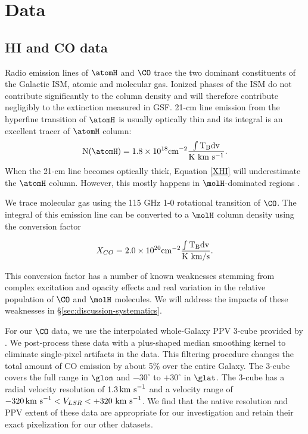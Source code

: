 \section{Data}
\label{sec:data}
\subsection{HI and CO data}

Radio emission lines of $\atomH$ and $\CO$ trace the two dominant constituents of the Galactic ISM, atomic and molecular gas. 
Ionized phases of the ISM do not contribute significantly to the column density and will therefore contribute negligibly to the extinction measured in GSF. 
21-cm line emission from the hyperfine transition of $\atomH$ is usually optically thin and its integral is an excellent tracer of $\atomH$ column:
\begin{equation}\label{XHI}
{\rm N(\atomH)} = 1.8 \times 10^{18} \rm cm^{-2} \frac{ \int T_B dv}{\rm K~km~s^{-1}}.
\end{equation}
When the 21-cm line becomes optically thick, Equation \ref{XHI} will underestimate the $\atomH$ column. 
However, this mostly happens in $\molH$-dominated regions \citep{Goldsmith_2007}.

We trace molecular gas using the 115 GHz 1-0 rotational transition of $\CO$. 
The integral of this emission line can be converted to a $\molH$ column density using the conversion factor \citep{Bolatto_2013}

\begin{equation}\label{XCO}
X_{CO} = 2.0 \times 10^{20} \rm cm^{-2} \frac{ \int T_B dv}{\rm K~km/s}.
\end{equation}

This conversion factor has a number of known weaknesses stemming from complex excitation and opacity effects and real variation in the relative population of $\CO$ and $\molH$ molecules. 
We will address the impacts of these weaknesses in \S \ref{sec:discussion-systematics}. 

For our $\CO$ data, we use the interpolated whole-Galaxy PPV 3-cube provided by \citet{Dame_2001}. 
We post-process these data with a plus-shaped median smoothing kernel to eliminate single-pixel artifacts in the data. 
This filtering procedure changes the total amount of CO emission by about 5\% over the entire Galaxy. 
The 3-cube covers the full range in $\glon$ and $-30^\circ$ to $+30^\circ$ in $\glat$. 
The 3-cube has a radial velocity resolution of $1.3 {\rm \, km~s}^{-1}$ and a velocity range of $-320{\rm \,km~s} ^{-1} < V_{LSR} < +320 \rm{~km~s}^{-1}$. 
We find that the native resolution and PPV extent of these data are appropriate for our investigation and retain their exact pixelization for our other datasets.

